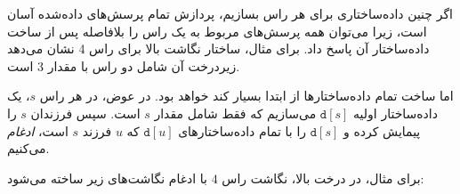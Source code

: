 \begin{center}
\end{center}

اگر چنین داده‌ساختاری برای هر راس بسازیم،
پردازش تمام پرسش‌های داده‌شده آسان است،
زیرا می‌توان همه پرسش‌های مربوط
به یک راس را بلافاصله پس از ساخت
داده‌ساختار آن پاسخ داد. برای مثال، ساختار
نگاشت بالا برای راس 4
نشان می‌دهد زیردرخت آن
شامل دو راس با مقدار 3 است.

اما ساخت تمام داده‌ساختارها از ابتدا بسیار کند خواهد بود.
در عوض، در هر راس $s$،
یک داده‌ساختار اولیه $\texttt{d}[s]$ می‌سازیم
که فقط شامل مقدار $s$ است.
سپس فرزندان $s$ را پیمایش کرده و
$\texttt{d}[s]$ را با تمام داده‌ساختارهای
$\texttt{d}[u]$ که $u$ فرزند $s$ است، \emph{ادغام} می‌کنیم.

برای مثال، در درخت بالا، نگاشت
راس $4$ با ادغام نگاشت‌های زیر ساخته می‌شود:

